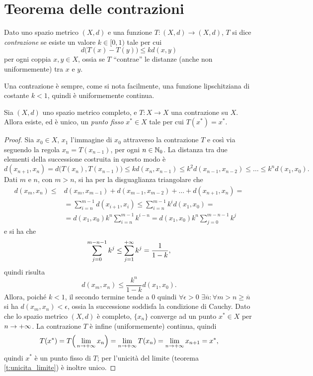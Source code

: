 \section{Teorema delle contrazioni}
\begin{definizione}
Dato uno spazio metrico $(X,d)$ e una funzione $T\colon(X,d)\to(X,d)$, $T$ si dice \emph{contrazione} se esiste un valore $k\in[0,1)$ tale per cui
\[
d\big(T(x)-T(y)\big)\leq k d(x,y)
\]
per ogni coppia $x,y\in X$, ossia se $T$ ``contrae'' le distanze (anche non uniformemente) tra $x$ e $y$.
\end{definizione}
Una contrazione è sempre, come si nota facilmente, una funzione lipschitziana di costante $k<1$, quindi è uniformemente continua.
\begin{teorema} \label{t:contrazioni}
Sia $(X,d)$ uno spazio metrico completo, e $T\colon X\to X$ una contrazione su $X$. Allora esiste, ed è unico, un \emph{punto fisso} $x^*\in X$ tale per cui $T(x^*)=x^*$.
\end{teorema}
\begin{proof}
Sia $x_0\in X$, $x_1$ l'immagine di $x_0$ attraverso la contrazione $T$ e così via seguendo la regola $x_n=T(x_{n-1})$, per ogni $n\in\mathbb{N}_0$. La distanza tra due elementi della successione costruita in questo modo è
\begin{equation*}
d(x_{n+1},x_n)=d\big(T(x_n),T(x_{n-1})\big)\leq kd(x_n,x_{n-1})\leq k^2d(x_{n-1},x_{n-2})\leq\dots\leq k^nd(x_1,x_0).
\end{equation*}
Dati $m$ e $n$, con $m>n$, si ha per la disguaglianza triangolare che
\begin{equation}
\begin{split}
d(x_m,x_n)\leq	&d(x_m,x_{m-1})+d(x_{m-1},x_{m-2})+\dots+d(x_{n+1},x_n)=\\
				&=\sum_{i=n}^{m-1}d(x_{i+1},x_i)\leq\sum_{i=n}^{m-1}k^id(x_1,x_0)=\\
				&=d(x_1,x_0)k^n\sum_{i=n}^{m-1}k^{i-n}=d(x_1,x_0)k^n\sum_{j=0}^{m-n-1}k^j
\end{split}
\end{equation}
e si ha che
\[
\sum_{j=0}^{m-n-1}k^j\leq\sum_{{j}=1}^{+\infty}k^j=\frac1{1-k},
\]
quindi risulta
\begin{equation}
d(x_m,x_n)\leq\frac{k^n}{1-k}d(x_1,x_0).
\end{equation}
Allora, poiché $k<1$, il secondo termine tende a 0 quindi $\forall\epsilon>0$ $\exists\overline{n}\colon\forall m>n\geq\overline{n}$ si ha $d(x_m,x_n)<\epsilon$, ossia la successione soddisfa la condizione di Cauchy. Dato che lo spazio metrico $(X,d)$ è completo, $\{x_n\}$ converge ad un punto $x^*\in X$ per $n\to+\infty$.
La contrazione $T$ è infine (uniformemente) continua, quindi
\[
T(x^*)=T\Big(\lim_{n\to+\infty}x_n\Big)=\lim_{n\to+\infty} T(x_n)=\lim_{n\to+\infty} x_{n+1}=x^*,
\]
quindi $x^*$ è un punto fisso di $T$; per l'unicità del limite (teorema \ref{t:unicita_limite}) è inoltre unico.
\end{proof}
